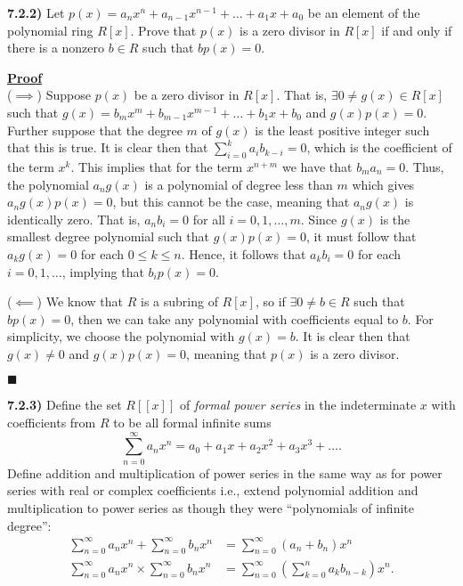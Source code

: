 \documentclass[12pt,a4paper]{article}
\newcommand{\prob}[2]{\textbf{#1)} #2}
\newenvironment{proof}
{
\textbf{\underline{Proof}} \\
}
{
\begin{flushright}
$\blacksquare$
\end{flushright}}
\begin{document}
\prob{7.2.2}{
Let $p\left( x \right) = a_{n}x^{n} + a_{n-1}x^{n-1} + \ldots + a_1x + a_0$ be an element of the polynomial ring $R[x]$.
Prove that $p(x)$ is a zero divisor in $R\left[ x \right]$ if and only if there is a nonzero $b \in R$ such that $bp(x) = 0$.
}

\begin{proof}
    ($\implies$) Suppose $p(x)$ be a zero divisor in $R[x]$.
    That is, $\exists 0 \ne g(x) \in R[x]$ such that $g(x) = b_{m}x^{m} + b_{m-1}x^{m-1} + \ldots + b_1x + b_0$ and $g(x)p(x) = 0$.
    Further suppose that the degree $m$ of $g(x)$ is the least positive integer such that this is true.
    It is clear then that $\sum_{i=0}^{k} a_ib_{k-i} = 0$, which is the coefficient of the term $x^{k}$. 
    This implies that for the term $x^{n+m}$ we have that $b_{m}a_{n} = 0$.
    Thus, the polynomial $a_{n}g(x)$ is a polynomial of degree less than $m$ which gives $a_{n}g(x)p(x) = 0$, but this cannot be the case, meaning that $a_{n}g(x)$ is identically zero.
    That is, $a_{n}b_{i} = 0$ for all $i = 0,1,\ldots,m$.
    Since $g(x)$ is the smallest degree polynomial such that $g(x)p(x) = 0$, it must follow that $a_{k}g(x) = 0$ for each $0 \leqslant k \leqslant n$.
    Hence, it follows that $a_{k}b_{i} = 0$ for each $i = 0,1,\ldots$, implying that $b_{i}p(x) = 0$.

    ($\impliedby$) We know that $R$ is a subring of $R[x]$, so if $\exists 0 \ne b \in R$ such that $bp(x) = 0$, then we can take any polynomial with coefficients equal to $b$. 
    For simplicity, we choose the polynomial with $g(x) = b$.
    It is clear then that $g(x) \ne 0$ and $g(x)p(x) = 0$, meaning that $p(x)$ is a zero divisor.
\end{proof}

\prob{7.2.3}{
Define the set $R[[x]]$ of \textit{formal power series} in the indeterminate $x$ with coefficients from $R$ to be all formal infinite sums
\[
\sum_{n=0}^{\infty} a_n x^n = a_0 + a_1x + a_2x^2 + a_3x^3 + \ldots
.\]
Define addition and multiplication of power series in the same way as for power series with real or complex coefficients i.e., extend polynomial addition and multiplication to power series as though they were ``polynomials of infinite degree'':
\begin{align*}
    \sum_{n=0}^{\infty} a_n x^n + \sum_{n=0}^{\infty} b_{n}x^{n} &= \sum_{n=0}^{\infty} (a_n + b_{n}) x^n \\
    \sum_{n=0}^{\infty} a_n x^n \times \sum_{n=0}^{\infty} b_n x^n &= \sum_{n=0}^{\infty} \left( \sum_{k=0}^{n} a_{k}b_{n-k} \right) x^n
.\end{align*}
}
\end{document}
